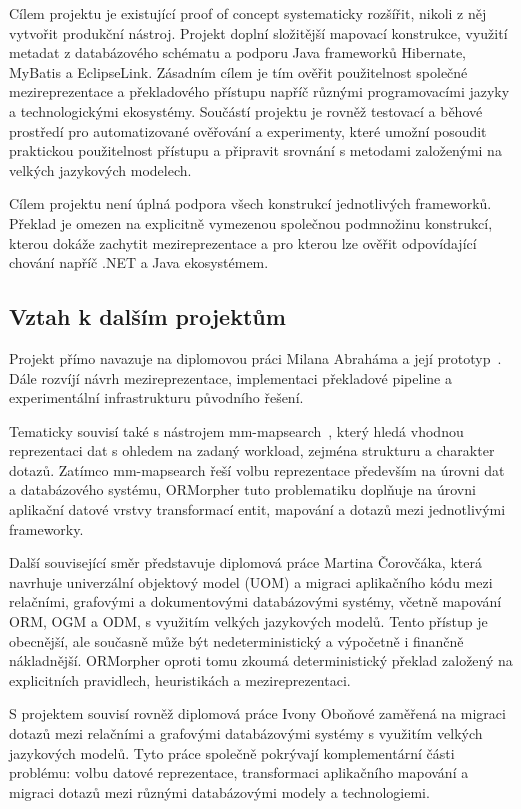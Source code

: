 \documentclass{article}
\begin{document}
Cílem projektu je existující proof of concept systematicky rozšířit, nikoli z něj vytvořit produkční nástroj. Projekt doplní složitější mapovací konstrukce, využití metadat z databázového schématu a podporu Java frameworků Hibernate, MyBatis a EclipseLink. Zásadním cílem je tím ověřit použitelnost společné mezireprezentace a překladového přístupu napříč různými programovacími jazyky a technologickými ekosystémy. Součástí projektu je rovněž testovací a běhové prostředí pro automatizované ověřování a experimenty, které umožní posoudit praktickou použitelnost přístupu a připravit srovnání s metodami založenými na velkých jazykových modelech.

Cílem projektu není úplná podpora všech konstrukcí jednotlivých frameworků. Překlad je omezen na explicitně vymezenou společnou podmnožinu konstrukcí, kterou dokáže zachytit mezireprezentace a pro kterou lze ověřit odpovídající chování napříč .NET a Java ekosystémem.

\subsection{Vztah k dalším projektům}

Projekt přímo navazuje na diplomovou práci Milana Abraháma a její prototyp~\cite{abraham-repo}. Dále rozvíjí návrh mezireprezentace, implementaci překladové pipeline a experimentální infrastrukturu původního řešení.

Tematicky souvisí také s nástrojem mm-mapsearch~\cite{mm-mapsearch}, který hledá vhodnou reprezentaci dat s ohledem na zadaný workload, zejména strukturu a charakter dotazů. Zatímco mm-mapsearch řeší volbu reprezentace především na úrovni dat a databázového systému, ORMorpher tuto problematiku doplňuje na úrovni aplikační datové vrstvy transformací entit, mapování a dotazů mezi jednotlivými frameworky.

Další související směr představuje diplomová práce Martina Čorovčáka, která navrhuje univerzální objektový model (UOM) a migraci aplikačního kódu mezi relačními, grafovými a dokumentovými databázovými systémy, včetně mapování ORM, OGM a ODM, s využitím velkých jazykových modelů. Tento přístup je obecnější, ale současně může být nedeterministický a výpočetně i finančně nákladnější. ORMorpher oproti tomu zkoumá deterministický překlad založený na explicitních pravidlech, heuristikách a mezireprezentaci.

S projektem souvisí rovněž diplomová práce Ivony Oboňové zaměřená na migraci dotazů mezi relačními a grafovými databázovými systémy s využitím velkých jazykových modelů. Tyto práce společně pokrývají komplementární části problému: volbu datové reprezentace, transformaci aplikačního mapování a migraci dotazů mezi různými databázovými modely a technologiemi.
\end{document}
